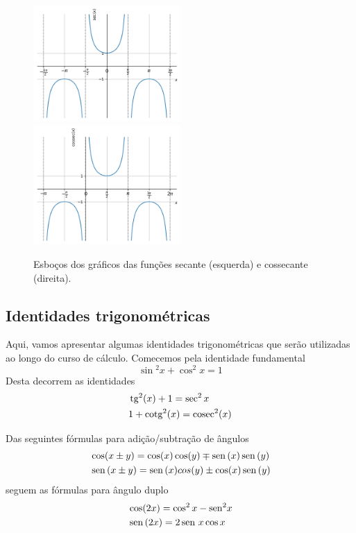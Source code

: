 \documentclass[../main.tex]{subfiles}
\begin{document}
\begin{figure}[H]
  \centering
  \includegraphics[width=0.5\textwidth]{fig_func/fig_sec_grafico}~
  \includegraphics[width=0.5\textwidth]{fig_func/fig_cosec_grafico}
  \caption{Esboços dos gráficos das funções secante (esquerda) e cossecante (direita).}
  \label{fig:co_sec_graficos}
\end{figure}
\subsection{Identidades trigonométricas}\label{subsec:IdentTrigometricas}
Aqui, vamos apresentar algumas identidades trigonométricas que serão utilizadas ao longo do curso de cálculo. Comecemos pela identidade fundamental
\begin{equation}
  \sin\!\!^2 x + \cos^2 x = 1\label{eq:IdentTrig}
\end{equation}
Desta decorrem as identidades
\begin{align}
  &\operatorname{tg}\,\!\!^2(x) + 1 = \sec^2 x\label{eq:tan^2}\\
  &1 + \operatorname{cotg}^2(x) = \operatorname{cosec}^2(x)\label{eq:cotan^2}
\end{align}

Das seguintes fórmulas para adição/subtração de ângulos
\begin{align}
  &\cos(x\pm y) = \cos(x)\cos(y) \mp \operatorname{sen}\,(x)\operatorname{sen}\,(y)\label{eq:CosSomDif}\\
  &\operatorname{sen}\,(x\pm y) = \operatorname{sen}\,(x)cos(y) \pm \cos(x)\operatorname{sen}\,(y)\label{eq:SenSomDif}
\end{align}
seguem as fórmulas para ângulo duplo
\begin{align}
  &\cos(2x) = \cos^2x - \operatorname{sen}\,\!\!^2x\\
  &\operatorname{sen}\,(2x) = 2\operatorname{sen}\, x\cos x
\end{align}
\end{document}
